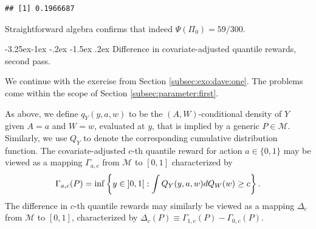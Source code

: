 \documentclass[]{article}
\makeatletter
\renewcommand\subsection{\@startsection{subsection}{3}{\z@}%
                                     {-3.25ex\@plus -1ex \@minus -.2ex}%
                                     {-1.5ex \@plus .2ex}%
                                     {\normalfont\normalsize\bfseries}}
\newcommand{\gear}{\usebox{\gearbox}\;}
\newcommand{\calM}{\mathcal{M}}
\theoremstyle{definition}
\theoremstyle{definition}
\theoremstyle{definition}
\theoremstyle{remark}
\makeatother
\begin{document}
\begin{verbatim}
## [1] 0.1966687
\end{verbatim}

Straightforward algebra confirms that indeed \(\Psi(\Pi_{0}) = 59/300\).

\subsection{\gear  Difference in  covariate-adjusted quantile  rewards, second
pass.}  
\label{subsec:exo:dave:two}

We continue with the exercise from Section \ref{subsec:exo:dave:one}.
The problems come within the scope of Section
\ref{subsec:parameter:first}.

As above, we define \(q_{Y}(y,a,w)\) to be the \((A,W)\)-conditional
density of \(Y\) given \(A=a\) and \(W=w\), evaluated at \(y\), that is
implied by a generic \(P \in \calM\). Similarly, we use \(Q_{Y}\) to
denote the corresponding cumulative distribution function. The
covariate-adjusted \(c\)-th quantile reward for action \(a \in \{0,1\}\)
may be viewed as a mapping \(\Gamma_{a,c}\) from \(\calM\) to \([0,1]\)
characterized by \begin{equation*} \Gamma_{a,c}(P)  = \inf\left\{y
\in  \interval[open]{0}{1}  :  \int   Q_{Y}(y,a,w)  dQ_W(w)  \ge  c  \right\}.
\end{equation*} The difference in \(c\)-th quantile rewards may
similarly be viewed as a mapping \(\Delta_c\) from \(\calM\) to
\([0,1]\), characterized by
\(\Delta_c(P) \equiv \Gamma_{1,c}(P) - \Gamma_{0,c}(P)\).
\end{document}
